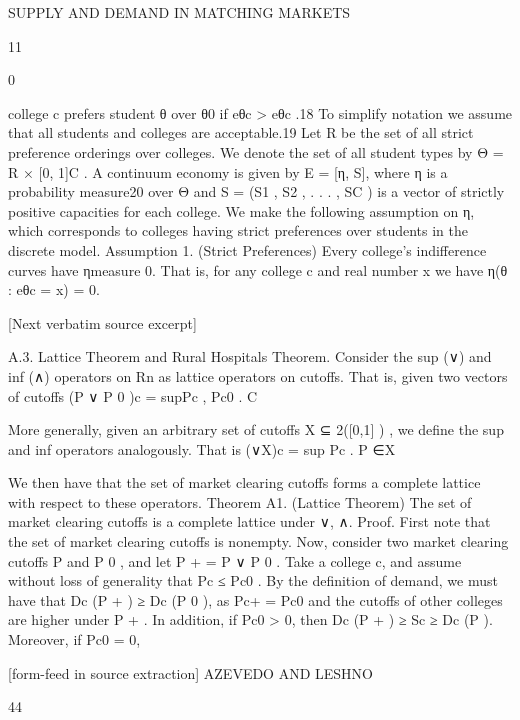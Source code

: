 \documentclass[10pt]{article}
\begin{document}
\begin{ReviewVerbatim}
SUPPLY AND DEMAND IN MATCHING MARKETS

11

0

college c prefers student θ over θ0 if eθc > eθc .18 To simplify notation we assume that all
students and colleges are acceptable.19 Let R be the set of all strict preference orderings
over colleges. We denote the set of all student types by Θ = R × [0, 1]C .
A continuum economy is given by E = [η, S], where η is a probability measure20
over Θ and S = (S1 , S2 , . . . , SC ) is a vector of strictly positive capacities for each
college. We make the following assumption on η, which corresponds to colleges having
strict preferences over students in the discrete model.
Assumption 1. (Strict Preferences) Every college’s indifference curves have ηmeasure 0. That is, for any college c and real number x we have η({θ : eθc = x}) = 0.

[Next verbatim source excerpt]

A.3. Lattice Theorem and Rural Hospitals Theorem. Consider the sup (∨) and
inf (∧) operators on Rn as lattice operators on cutoffs. That is, given two vectors of
cutoffs
(P ∨ P 0 )c = sup{Pc , Pc0 }.
C

More generally, given an arbitrary set of cutoffs X ⊆ 2([0,1] ) , we define the sup and
inf operators analogously. That is
(∨X)c = sup Pc .
P ∈X

We then have that the set of market clearing cutoffs forms a complete lattice with
respect to these operators.
Theorem A1. (Lattice Theorem) The set of market clearing cutoffs is a complete
lattice under ∨, ∧.
Proof. First note that the set of market clearing cutoffs is nonempty. Now, consider
two market clearing cutoffs P and P 0 , and let P + = P ∨ P 0 . Take a college c, and
assume without loss of generality that Pc ≤ Pc0 . By the definition of demand, we must
have that Dc (P + ) ≥ Dc (P 0 ), as Pc+ = Pc0 and the cutoffs of other colleges are higher
under P + . In addition, if Pc0 > 0, then Dc (P + ) ≥ Sc ≥ Dc (P ). Moreover, if Pc0 = 0,


[form-feed in source extraction]
AZEVEDO AND LESHNO

44


\end{ReviewVerbatim}
\end{document}
